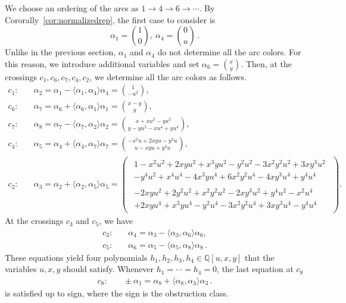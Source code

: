\documentclass[12pt,reqno]{amsart}
\newcommand{\lrbar}[1]{\langle #1 \rangle}
\theoremstyle{definition}
\begin{document}
	We choose an ordering of the arcs as $1 \rightarrow 4 \rightarrow 6 \rightarrow \cdots$. By  Cororally~\ref{cor:normalizedrep}, the first case to consider is
	\begin{equation} \label{eqn.case2}
		\alpha_1=\binom{1}{0},\ \alpha_4 =\binom{0}{u}\,.
	\end{equation}
	Unlike in the previous section, $\alpha_1$ and $\alpha_4$ do not determine all the arc colors. For this reason, we introduce additional variables and set $\alpha_6=\binom{x}{y}$. Then, at the crossings $c_1, c_6, c_7, c_4, c_2$, we determine all the arc colors as follows.
	\begin{align*}
		c_1 : &\quad \alpha_2=\alpha_1-\lrbar{ \alpha_1, \alpha_4 } \alpha_4=\binom{ 1 }{ -u^2 },\\ 
		c_6 : & \quad \alpha_7=\alpha_6+\lrbar {\alpha_6, \alpha_1} \alpha_1=\binom{ x-y }{ y },\\ 
		c_7:& \quad \alpha_8=\alpha_7-\lrbar {\alpha_7, \alpha_2} \alpha_2=\binom{x + x u^2 - y u^2 }{ y - y u^2 - x u^4 + y u^4 },\\
		c_4 :& \quad \alpha_5=\alpha_4+\lrbar {\alpha_4, \alpha_7} \alpha_7=\binom{ -x^2 u + 2 x y u - y^2 u }{ u - x y u + y^2 u },\\
		c_2:&\quad \alpha_3=\alpha_2+\lrbar {\alpha_2, \alpha_5} \alpha_5=\begin{pmatrix*}
			\begin{aligned}
				1 - x^2 u^2 + 2 x y u^2 + x^3 y u^2 - y^2 u^2 - 3 x^2 y^2 u^2 + 
				3 x y^3 u^2 \\- y^4 u^2 + x^4 u^4 - 4 x^3 y u^4 + 6 x^2 y^2 u^4 - 
				4 x y^3 u^4 + y^4 u^4
			\end{aligned} \\[2.6ex]
			\begin{aligned}
				-2 x y u^2 + 2 y^2 u^2 + x^2 y^2 u^2 - 
				2 x y^3 u^2 + y^4 u^2 - x^2 u^4\\ + 2 x y u^4 + x^3 y u^4 - y^2 u^4 - 
				3 x^2 y^2 u^4 + 3 x y^3 u^4 - y^4 u^4
			\end{aligned}
		\end{pmatrix*}.
	\end{align*}
    At the crossings $c_3$ and $c_5$, we have
    \begin{align*}
		c_3 :& \quad \alpha_4 = \alpha_3 - \langle \alpha_3, \alpha_6\rangle \alpha_6, \\
		c_5 :& \quad \alpha_6 = \alpha_5 - \langle \alpha_5, \alpha_8\rangle \alpha_8 \, .
	\end{align*}
    These equations yield four polynomials $h_1,h_2,h_3,h_4\in\mathbb{Q}[u,x,y]$ that the variables $u,x,y$ should satisfy. Whenever $h_1=\cdots=h_4=0$, the last equation at $c_8$ 
    \begin{align*}
		c_8 : & \quad \pm \alpha_1 =\alpha_8+ \langle \alpha_8, \alpha_3 \rangle \alpha_3\,.
	\end{align*}
    is satisfied up to sign, where the sign is the obstruction class.
    
\end{document}
